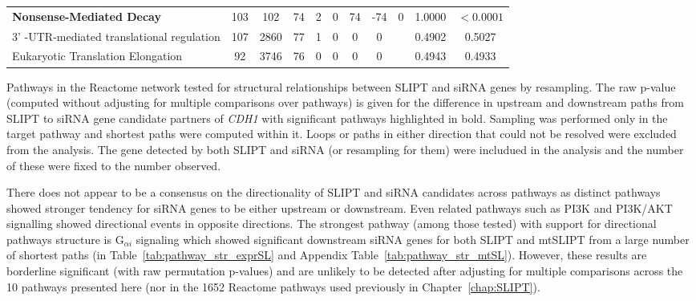 \begin{table*}[!htb]
{{\begin{threeparttable}
\begin{tabular}{l|cc|cc|cccc|cc}
\rowcolor{black!5}
\textbf{Nonsense-Mediated Decay}                   & 103         & 102          & 74            & 2           & 0    & 74   & -74     & 0            & 1.0000             & $<0.0001$                   \\
\rowcolor{black!10}
3' -UTR-mediated translational regulation & 107         & 2860         & 77            & 1           & 0    & 0    & 0       &              & 0.4902             & 0.5027              \\
\rowcolor{black!5}
Eukaryotic Translation Elongation         & 92          & 3746         & 76            & 0           & 0    & 0    & 0       &              & 0.4943             & 0.4933              \\
\hline
\end{tabular}
\begin{tablenotes}
\raggedright \small
Pathways in the Reactome network tested for structural relationships between \gls{SLIPT} and \gls{siRNA} genes by resampling. The raw p-value (computed without adjusting for multiple comparisons over pathways) is given for the difference in upstream and downstream paths from \gls{SLIPT} to \gls{siRNA} gene candidate partners of \textit{CDH1} with significant pathways highlighted in bold. Sampling was performed only in the target pathway and shortest paths were computed within it. Loops or paths in either direction that could not be resolved were excluded from the analysis. The gene detected by both \gls{SLIPT} and \gls{siRNA} (or resampling for them) were includued in the analysis and the number of these were fixed to the number observed.
\end{tablenotes}
\end{threeparttable}
}
}
\end{table*}

There does not appear to be a consensus on the directionality of \gls{SLIPT} and \gls{siRNA} candidates across pathways as distinct pathways showed stronger tendency for \gls{siRNA} genes to be either upstream or downstream. Even related pathways such as \gls{PI3K} and PI3K/AKT signalling showed directional events in opposite directions. The strongest pathway (among those tested) with support for directional pathways structure is G$_{\alpha i}$ signaling which showed significant downstream \gls{siRNA} genes for both SLIPT and mtSLIPT from a large number of shortest paths (in Table~\ref{tab:pathway_str_exprSL} and Appendix Table~\ref{tab:pathway_str_mtSL}). However, these results are borderline significant (with raw permutation p-values) and are unlikely to be detected after adjusting for multiple comparisons across the 10 pathways presented here (nor in the 1652 Reactome pathways used previously in Chapter~\ref{chap:SLIPT}).

